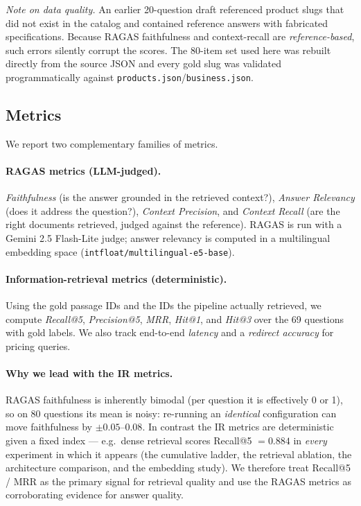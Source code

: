 \noindent\textit{Note on data quality.} An earlier 20-question draft referenced
product slugs that did not exist in the catalog and contained reference answers
with fabricated specifications. Because RAGAS faithfulness and context-recall
are \emph{reference-based}, such errors silently corrupt the scores. The 80-item
set used here was rebuilt directly from the source JSON and every gold slug was
validated programmatically against \texttt{products.json}/\texttt{business.json}.

\subsection{Metrics}
We report two complementary families of metrics.

\paragraph{RAGAS metrics \cite{es2023ragas} (LLM-judged).}
\textit{Faithfulness} (is the answer grounded in the retrieved context?),
\textit{Answer Relevancy} (does it address the question?),
\textit{Context Precision}, and \textit{Context Recall} (are the right documents
retrieved, judged against the reference). RAGAS is run with a Gemini 2.5
Flash-Lite judge; answer relevancy is computed in a multilingual embedding space
(\texttt{intfloat/multilingual-e5-base}).

\paragraph{Information-retrieval metrics (deterministic).}
Using the gold passage IDs and the IDs the pipeline actually retrieved, we
compute \textit{Recall@5}, \textit{Precision@5}, \textit{MRR}, \textit{Hit@1},
and \textit{Hit@3} over the 69 questions with gold labels. We also track
end-to-end \textit{latency} and a \textit{redirect accuracy} for pricing queries.

\paragraph{Why we lead with the IR metrics.}
RAGAS faithfulness is inherently bimodal (per question it is effectively
0 or 1), so on 80 questions its mean is noisy: re-running an \emph{identical}
configuration can move faithfulness by ${\pm}0.05$--$0.08$. In contrast the IR
metrics are deterministic given a fixed index --- e.g.\ dense retrieval scores
Recall@5 $=0.884$ in \emph{every} experiment in which it appears (the cumulative
ladder, the retrieval ablation, the architecture comparison, and the embedding
study). We therefore treat Recall@5 / MRR as the primary signal for retrieval
quality and use the RAGAS metrics as corroborating evidence for answer quality.

